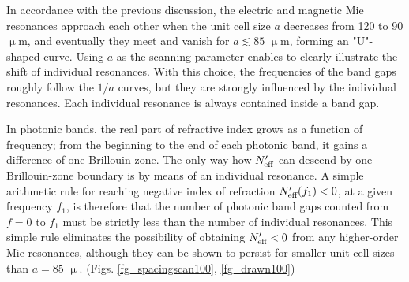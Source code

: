 In accordance with the previous discussion, the electric and magnetic Mie resonances approach each other when the unit cell size $a$ decreases from 120 to 90 $\upmu$m, and eventually they meet and vanish for $a \lesssim 85$ $\upmu$m, forming an "U"-shaped curve. Using $a$ as the scanning parameter enables to clearly illustrate the shift of individual resonances. With this choice, the frequencies of the band gaps roughly follow the $1/a$ curves, but they are strongly influenced by the individual resonances. Each individual resonance is always contained inside a band gap.

In photonic bands, the real part of refractive index grows as a function of frequency; from the beginning to the end of each photonic band, it gains a difference of one Brillouin zone. The only way how $N_{\text{eff} }'$ can descend by one Brillouin-zone boundary is by means of an individual resonance. A simple arithmetic rule for reaching negative index of refraction $N_{\text{eff} }'(f_1)<0$, at a given frequency $f_1$, is therefore that the number of photonic band gaps counted from $f=0$ to $f_1$ must be strictly less than the number of individual resonances. 
This simple rule eliminates the possibility of obtaining $N_{\text{eff} }'<0$ from any higher-order Mie resonances, although they can be shown to persist for smaller unit cell sizes than $a=85$ $\upmu$.  (Figs. \ref{fg_spacingscan100}, \ref{fg_drawn100})

